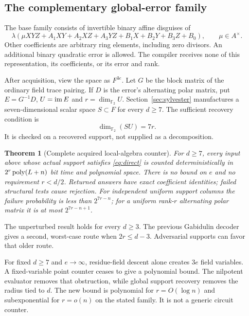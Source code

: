 \documentclass[11pt]{article}
\newtheorem{theorem}{Theorem}[section]\newtheorem{lemma}[theorem]{Lemma}
\theoremstyle{remark}\newtheorem{remark}[theorem]{Remark}
\newcommand{\F}{\mathbb F}\newcommand{\Tr}{\operatorname{Tr}}
\begin{document}
\subsection{The complementary global-error family}
The base family consists of invertible binary affine disguises of
\begin{equation}\label{eq:family}
 \lambda(\mu XYZ+A_1XY+A_2XZ+A_3YZ+B_1X+B_2Y+B_3Z+B_0),
 \qquad \mu\in A^\times.
\end{equation}
Other coefficients are arbitrary ring elements, including zero divisors.
An additional binary quadratic error is allowed. The compiler receives none
of this representation, its coefficients, or its error and rank.

After acquisition, view the space as $F^{3e}$. Let $G$ be the block matrix
of the ordinary field trace pairing. If $D$ is the error's alternating polar
matrix, put $E=G^{-1}D$, $U=\operatorname{im} E$ and $r=\dim_{\F_2}U$.
Section~\ref{sec:sylvester} manufactures a seven-dimensional scalar space
$S\subset F$ for every $d\ge7$. The sufficient recovery condition is
\begin{equation}\label{eq:direct}
 \dim_{\F_2}(SU)=7r.
\end{equation}
It is checked on a recovered support, not supplied as a decomposition.

\begin{theorem}[Complete acquired local-algebra counter]\label{thm:main}
For $d\ge7$, every input above whose actual support satisfies
\eqref{eq:direct} is counted deterministically in $2^r\operatorname{poly}(L+n)$ bit time
and polynomial space. There is no bound on $e$ and no requirement $r<d/2$.
Returned answers have exact coefficient identities; failed structural tests
cause rejection. For independent uniform support columns the failure
probability is less than $2^{7r-n}$; for a uniform rank-$r$ alternating
polar matrix it is at most $2^{7r-n+1}$.
\end{theorem}
The unperturbed result holds for every $d\ge3$. The previous Gabidulin
decoder gives a second, worst-case route when $2r\le d-3$. Adversarial
supports can favor that older route.

For fixed $d\ge7$ and $e\to\infty$, residue-field descent alone creates
$3e$ field variables. A fixed-variable point counter ceases to give a
polynomial bound. The nilpotent evaluator removes that obstruction,
while global support recovery removes the radius tied to $d$. The new
bound is polynomial for $r=O(\log n)$ and subexponential for $r=o(n)$
on the stated family. It is not a generic circuit counter.
\end{document}
